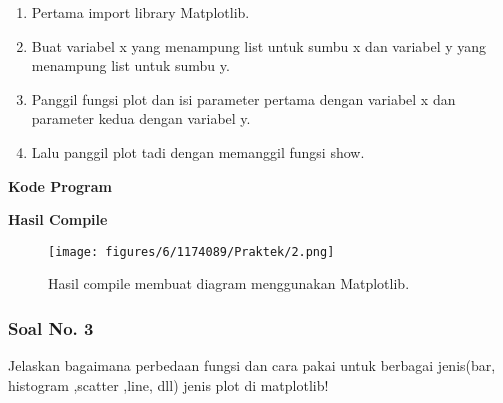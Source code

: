 \begin{enumerate}
	\item Pertama import library Matplotlib.	
	
	
	\item Buat variabel x yang menampung list untuk sumbu x dan variabel y yang menampung list untuk sumbu y.	
	
	
	\item Panggil fungsi plot dan isi parameter pertama dengan variabel x dan parameter kedua dengan variabel y.
		

	\item Lalu panggil plot tadi dengan memanggil fungsi show.
	
	
\end{enumerate}
\hfill \break
\textbf{Kode Program}



\hfill \break
\textbf{Hasil Compile}

\begin{figure}[H]
	\texttt{[image: figures/6/1174089/Praktek/2.png]}
	\centering
	\caption{Hasil compile membuat diagram menggunakan Matplotlib.}
\end{figure}
 
\subsubsection{Soal No. 3}
\hfill \break
Jelaskan bagaimana perbedaan fungsi dan cara pakai untuk berbagai jenis(bar, histogram ,scatter ,line, dll) jenis plot di matplotlib!

